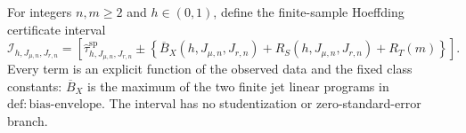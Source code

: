 For integers \(n,m\ge2\) and \(h\in(0,1)\), define the finite-sample Hoeffding certificate interval
\[
\mathcal I_{h,J_{\mu,n},J_{r,n}}
=\left[
\widehat\tau^{\mathrm{sp}}_{h,J_{\mu,n},J_{r,n}}
\pm\left\{\overline B_X(h,J_{\mu,n},J_{r,n})+R_S(h,J_{\mu,n},J_{r,n})+R_T(m)\right\}
\right].
\]
Every term is an explicit function of the observed data and the fixed class constants: \(\overline B_X\) is the maximum of the two finite jet linear programs in \(\mathrm{def:bias\text{-}envelope}\). The interval has no studentization or zero-standard-error branch.